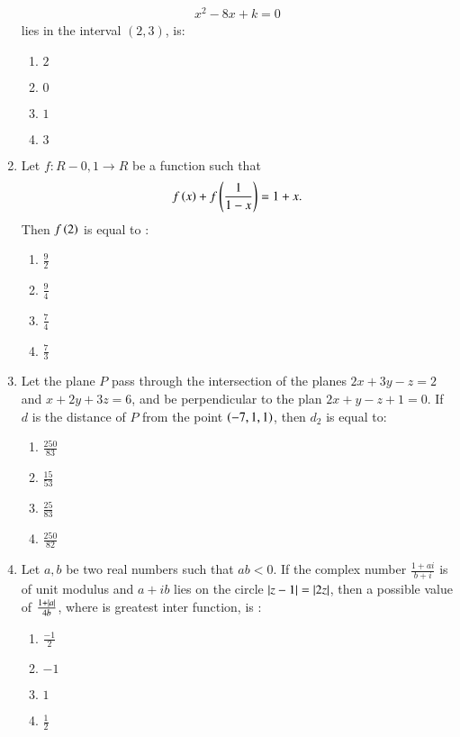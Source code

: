 \documentclass[journal]{IEEEtran}
\begin{document}
\begin{enumerate}
              \begin{align*}
		x^2-8x+k=0
              \end{align*}
		      lies in the interval $(2,3)$, is:
		\begin{enumerate}
			\item $2$
			\item $0$
			\item $1$
			\item $3$
        	\end{enumerate}
	\item Let $f:R-{0,1} \rightarrow R$ be a function such that 
             \begin{align*}
		f\left(x\right)+f\left(\frac{1}{1-x}\right)=1+x.
             \end{align*}
		Then $f\left(2\right)$ is equal to :
		\begin{enumerate}
			\item $\frac{9}{2}$
                        \item $\frac{9}{4}$
                        \item $\frac{7}{4}$
                        \item $\frac{7}{3}$
        	\end{enumerate}	
	\item  Let the plane $P$ pass through the intersection of the planes $2x+3y-z=2$ and $x+2y+3z=6$, and be perpendicular to the plan $2x+y-z+1=0$. If $d$ is the distance of $P$ from the point $\left(-7,1,1\right)$, then $d_2$ is equal to:
		\begin{enumerate}
			\item $\frac{250}{83}$
			\item $\frac{15}{53}$
			\item $\frac{25}{83}$
			\item $\frac{250}{82}$
        	\end{enumerate}	
	\item Let $a, b$ be two real numbers such that $ab<0$. If the complex number $\frac{1+ai}{b+i}$ is of unit modulus and $a+ib $ lies on the circle $\left\vert z-1\right\vert=\left\vert2z\right\vert$, then a possible value of $\frac{1+\left\vert a\right\vert}{4b}$, where  is greatest inter function, is : 
                \begin{enumerate}
			\item $\frac{-1}{2}$
			\item $-1$
			\item $1$
			\item $\frac{1}{2}$
        	\end{enumerate}		

\end{enumerate}
\end{document}
